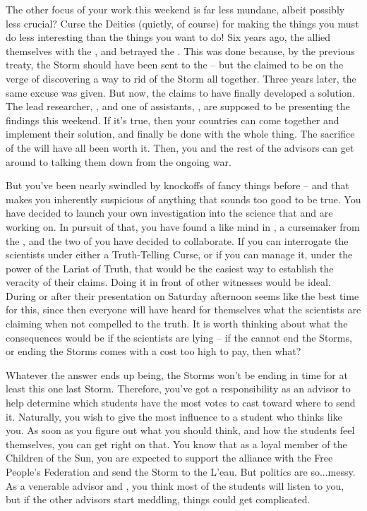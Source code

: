 \documentclass[char]{GL2020}
\begin{document}
The other focus of your work this weekend is far less mundane, albeit possibly less crucial? Curse the Deities (quietly, of course) for making the things you must do less interesting than the things you want to do! Six years ago, the \pFarm{} allied themselves with the \pTech{}, and betrayed the \pShip{}. This was done because, by the previous treaty, the Storm should have been sent to the \pTech{} -- but the \pTech{} claimed to be on the verge of discovering a way to rid \pEarth{} of the Storm all together. Three years later, the same excuse was given. But now, the \pTech{} claims to have finally developed a solution. The lead researcher, \cHeadScientist{\full}, and one of \cHeadScientist{\their} assistants, \cAssistantScientist{\full}, are supposed to be presenting the findings this weekend. If it's true, then your countries can come together and implement their solution, and finally be done with the whole thing. The sacrifice of the \pShip{} will have all been worth it. Then, you and the rest of the advisors can get around to talking them down from the ongoing war.

But you've been nearly swindled by knockoffs of fancy things before -- and that makes you inherently suspicious of anything that sounds too good to be true. You have decided to launch your own investigation into the science that \cHeadScientist{} and \cAssistantScientist{} are working on. In pursuit of that, you have found a like mind in \cCurse{\full}, a cursemaker from the \pFarm{}, and the two of you have decided to collaborate. If you can interrogate the scientists under either a Truth-Telling Curse, or if you can manage it, under the power of the Lariat of Truth, that would be the easiest way to establish the veracity of their claims. Doing it in front of other witnesses would be ideal. During or after their presentation on Saturday afternoon seems like the best time for this, since then everyone will have heard for themselves what the scientists are claiming when not compelled to the truth. It is worth thinking about what the consequences would be if the scientists are lying – if the \pTech{} cannot end the Storms, or ending the Storms comes with a cost too high to pay, then what? 

Whatever the answer ends up being, the Storms won't be ending in time for at least this one last Storm. Therefore, you've got a responsibility as an advisor to help determine which students have the most votes to cast toward where to send it. Naturally, you wish to give the most influence to a student who thinks like you. As soon as you figure out what you should think, and how the students feel themselves, you can get right on that. You know that as a loyal member of the Children of the Sun, you are expected to support the alliance with the Free People's Federation and send the Storm to the L'eau. But politics are so...messy. As a venerable advisor and \cHedonist{\cleric}, you think most of the students will listen to you, but if the other advisors start meddling, things could get complicated. 
\end{document}
